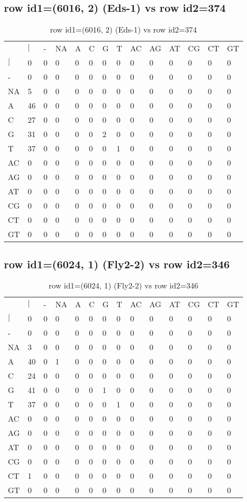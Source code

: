 \subsection{row id1=(6016, 2) (Eds-1) vs row id2=374}
\begin{center}
\begin{longtable}{|l|l|l|l|l|l|l|l|l|l|l|l|l|l|}
\caption{row id1=(6016, 2) (Eds-1) vs row id2=374} \label{table_dm18}\\
\hline
\\
\hline
&$|$&-&NA&A&C&G&T&AC&AG&AT&CG&CT&GT\\
$|$&0&0&0&0&0&0&0&0&0&0&0&0&0\\
-&0&0&0&0&0&0&0&0&0&0&0&0&0\\
NA&5&0&0&0&0&0&0&0&0&0&0&0&0\\
A&46&0&0&0&0&0&0&0&0&0&0&0&0\\
C&27&0&0&0&0&0&0&0&0&0&0&0&0\\
G&31&0&0&0&0&2&0&0&0&0&0&0&0\\
T&37&0&0&0&0&0&1&0&0&0&0&0&0\\
AC&0&0&0&0&0&0&0&0&0&0&0&0&0\\
AG&0&0&0&0&0&0&0&0&0&0&0&0&0\\
AT&0&0&0&0&0&0&0&0&0&0&0&0&0\\
CG&0&0&0&0&0&0&0&0&0&0&0&0&0\\
CT&0&0&0&0&0&0&0&0&0&0&0&0&0\\
GT&0&0&0&0&0&0&0&0&0&0&0&0&0\\
\hline
\end{longtable}
\end{center}

\subsection{row id1=(6024, 1) (Fly2-2) vs row id2=346}
\begin{center}
\begin{longtable}{|l|l|l|l|l|l|l|l|l|l|l|l|l|l|}
\caption{row id1=(6024, 1) (Fly2-2) vs row id2=346} \label{table_dm20}\\
\hline
\\
\hline
&$|$&-&NA&A&C&G&T&AC&AG&AT&CG&CT&GT\\
$|$&0&0&0&0&0&0&0&0&0&0&0&0&0\\
-&0&0&0&0&0&0&0&0&0&0&0&0&0\\
NA&3&0&0&0&0&0&0&0&0&0&0&0&0\\
A&40&0&1&0&0&0&0&0&0&0&0&0&0\\
C&24&0&0&0&0&0&0&0&0&0&0&0&0\\
G&41&0&0&0&0&1&0&0&0&0&0&0&0\\
T&37&0&0&0&0&0&1&0&0&0&0&0&0\\
AC&0&0&0&0&0&0&0&0&0&0&0&0&0\\
AG&0&0&0&0&0&0&0&0&0&0&0&0&0\\
AT&0&0&0&0&0&0&0&0&0&0&0&0&0\\
CG&0&0&0&0&0&0&0&0&0&0&0&0&0\\
CT&1&0&0&0&0&0&0&0&0&0&0&0&0\\
GT&0&0&0&0&0&0&0&0&0&0&0&0&0\\
\hline
\end{longtable}
\end{center}

